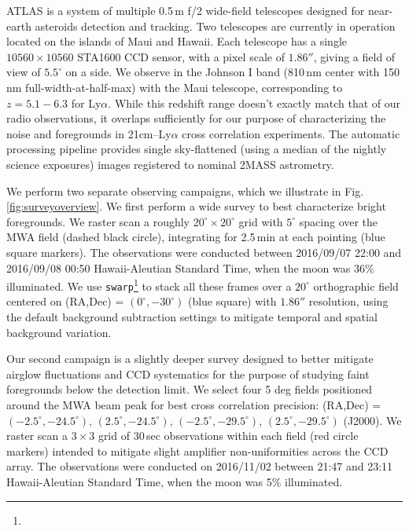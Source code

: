 \documentclass[numberedappendix]{emulateapj}
\begin{document}
ATLAS is a system of multiple 0.5\,m f/2 wide-field telescopes \citep{tonry11} designed for near-earth asteroids detection and tracking. Two telescopes are currently in operation located on the islands of Maui and Hawaii.   Each telescope has a single $10560\times10560$ STA1600 CCD sensor, with a pixel scale of $1.86''$, giving a field of view of $5.5^\circ$ on a side.  We observe in the Johnson I band (810\,nm center with 150\,nm full-width-at-half-max) with the Maui telescope, corresponding to $z=5.1-6.3$ for Ly$\alpha$.  While this redshift range doesn't exactly match that of our radio observations, it overlaps sufficiently for our purpose of characterizing the noise and foregrounds in 21cm--Ly$\alpha$ cross correlation experiments. The automatic processing pipeline provides single sky-flattened (using a median of the nightly science exposures) images registered to nominal 2MASS astrometry.

We perform two separate observing campaigns, which we illustrate in Fig. \ref{fig:surveyoverview}. We first perform a wide survey to best characterize bright foregrounds. We raster scan a roughly $20^\circ\times20^\circ$ grid with $5^\circ$ spacing over the MWA field (dashed black circle), integrating for 2.5\,min at each pointing (blue square markers). The observations were conducted between 2016/09/07 22:00  and 2016/09/08 00:50 Hawaii-Aleutian Standard Time, when the moon was 36\% illuminated. We use {\tt swarp}\footnote{} \citep{swarp} to stack all these frames over a $20^\circ$ orthographic field centered on (RA,Dec) = $(0^\circ,-30^\circ)$ (blue square) with $1.86''$ resolution, using the default background subtraction settings to mitigate temporal and spatial background variation. 


Our second campaign is a slightly deeper survey designed to better mitigate airglow fluctuations and CCD systematics for the purpose of studying faint foregrounds below the detection limit. We select four 5 deg fields positioned around the MWA beam peak for best cross correlation precision: (RA,Dec) = $(-2.5^\circ, -24.5^\circ)$, $(2.5^\circ, -24.5^\circ)$, $(-2.5^\circ, -29.5^\circ)$, $(2.5^\circ, -29.5^\circ)$ (J2000). We raster scan a $3\times3$ grid of 30\,sec observations within each field (red circle markers) intended to mitigate slight amplifier non-uniformities across the CCD array. The observations were conducted on 2016/11/02 between 21:47 and 23:11 Hawaii-Aleutian Standard Time, when the moon was 5\% illuminated. 
\end{document}
